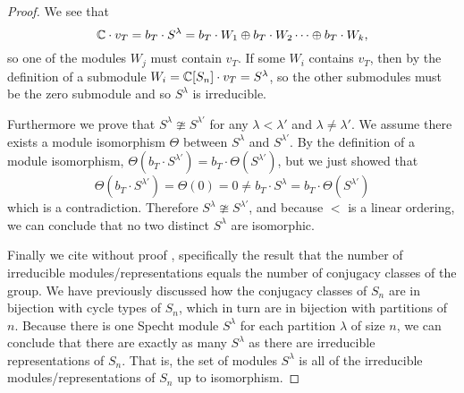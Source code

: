 \documentclass[11 pt]{amsart}
\theoremstyle{plain}   %
\theoremstyle{definition}
\theoremstyle{remark}
\numberwithin{equation}{section}
\begin{document}
\begin{proof}
  We see that
  \[\mathbb{C} \cdot v_T = b_T \cdot S^\lambda = b_T \cdot W_1 \oplus b_T \cdot W_2 \dots \oplus b_T \cdot W_k,\]
  so one of the modules $W_j$ must contain $v_T$.
  If some $W_i$ contains $v_T$, then by the definition of a submodule $W_i = \mathbb{C} [S_n] \cdot v_T = S^\lambda$, so
  the other submodules must be the zero submodule and so $S^\lambda$ is irreducible.
  \par
  Furthermore we prove that $S^\lambda  \ncong S^{\lambda'}$ for any $\lambda < \lambda'$ and $\lambda \neq \lambda'$.
  We assume there exists a module isomorphism $\Theta$ between $S^\lambda$ and $S^{\lambda'}$.
  By the definition of a module isomorphism, $\Theta(b_T \cdot S^{\lambda'}) = b_T \cdot \Theta( S^{\lambda'})$,
  but we just showed that
  \[\Theta(b_T \cdot S^{\lambda'}) = \Theta(0) = 0 \neq b_T \cdot S^\lambda = b_T \cdot \Theta( S^{\lambda'})\]
  which is a contradiction. Therefore $S^\lambda \ncong S^{\lambda'}$, and because $<$ is a linear ordering, we can conclude that
  no two distinct $S^\lambda$ are isomorphic. \par
  Finally we cite without proof \cite[Proposition 1.10.1]{sagan}, specifically the result that the number of irreducible modules/representations equals
  the number of conjugacy classes of the group. We have previously discussed how the conjugacy classes of $S_n$ are in bijection with cycle types of $S_n$,
  which in turn are in bijection with partitions of $n$.
  Because there is one Specht module $S^\lambda$ for each partition $\lambda$ of size $n$,
  we can conclude that there are exactly as many $S^\lambda$ as there are irreducible representations of $S_n$.
  That is, the set of modules $S^\lambda$ is all of the irreducible modules/representations of $S_n$ up to isomorphism.
  \end{proof}
  
\end{document}
